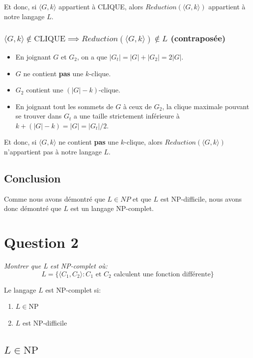 \documentclass[10pt]{article}
\newcommand{\NP}{\text{NP}}
\begin{document}
Et donc, si $\langle G,k \rangle$ appartient à CLIQUE, alors
$Reduction(\langle G,k \rangle)$ appartient à notre langage $L$.


\subsubsection{$\langle G,k \rangle \not\in \text{CLIQUE} \implies
  Reduction(\langle G,k \rangle) \not\in L$ (contraposée)}

\begin{itemize}
\item En joignant $G$ et $G_2$, on a que $|G_t| = |G| + |G_2| = 2|G|$.
\item $G$ ne contient \textbf{pas} une $k$-clique.
\item $G_2$ contient une $(|G|-k)$-clique.
\item En joignant tout les sommets de $G$ à ceux de $G_2$, la clique
  maximale pouvant se trouver dans $G_t$ a une taille strictement
  inférieure à $k + (|G|-k) = |G| = |G_t|/2$.
\end{itemize}

Et donc, si $\langle G,k \rangle$ ne contient \textbf{pas} une
$k$-clique, alors $Reduction(\langle G,k \rangle)$ n'appartient pas à
notre langage $L$.

\subsection{Conclusion}

Comme nous avons démontré que $L \in NP$ et que $L$ est NP-difficile,
nous avons donc démontré que $L$ est un langage NP-complet.

\newpage

\section{Question 2}

\emph{Montrer que L est NP-complet où:}
\[
L = \{ \langle C_1, C_2 \rangle : \text{$C_1$ et $C_2$ calculent une
  fonction différente} \}
\]

Le langage $L$ est NP-complet si:
\begin{enumerate}
  \item $L \in \NP$
  \item $L$ est NP-difficile
\end{enumerate}

\subsection{$L \in \NP$}
\end{document}
